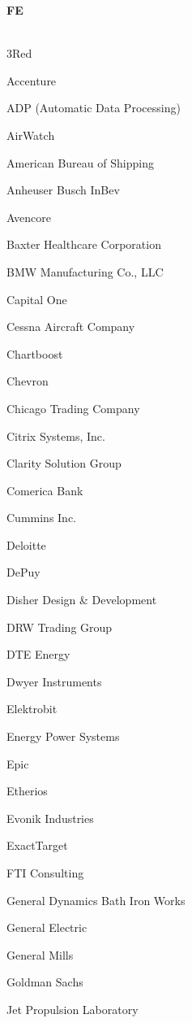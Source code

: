\documentclass[twoside]{article}
\begin{document}
\begin{center}
\begin{multicols}{5}
        {\fontsize{14}{16}\selectfont \bf FE}\\
        \vspace{-1em}
        ~\hrulefill~
        \vspace{-.9em}
        \begin{FlushLeft}
        \begin{compactitem}
        \item 3Red
\item Accenture
\item ADP (Automatic Data Processing)
\item AirWatch
\item American Bureau of Shipping
\item Anheuser Busch InBev
\item Avencore
\item Baxter Healthcare Corporation
\item BMW Manufacturing Co., LLC
\item Capital One
\item Cessna Aircraft Company
\item Chartboost
\item Chevron
\item Chicago Trading Company
\item Citrix Systems, Inc.
\item Clarity Solution Group
\item Comerica Bank
\item Cummins Inc.
\item Deloitte
\item DePuy
\item Disher Design \& Development
\item DRW Trading Group
\item DTE Energy
\item Dwyer Instruments
\item Elektrobit
\item Energy Power Systems
\item Epic
\item Etherios
\item Evonik Industries
\item ExactTarget
\item FTI Consulting
\item General Dynamics Bath Iron Works
\item General Electric
\item General Mills
\item Goldman Sachs
\item Jet Propulsion Laboratory

\end{compactitem}
\end{FlushLeft}
\end{multicols}
\end{center}
\end{document}
